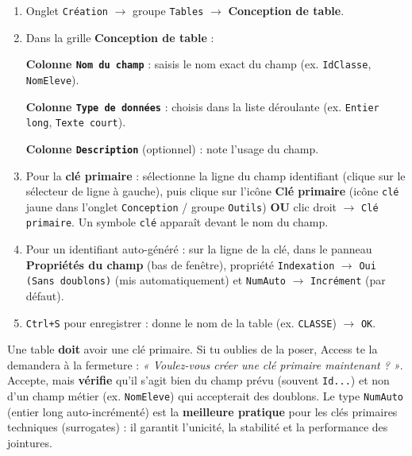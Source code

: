 \documentclass[11pt]{article}
\begin{document}
\begin{methode}
\begin{enumerate}
    \item Onglet \texttt{Création} $\to$ groupe \texttt{Tables} $\to$ \textbf{Conception de table}.
    \item Dans la grille \textbf{Conception de table} :\par
    \textbf{Colonne \texttt{Nom du champ}} : saisis le nom exact du champ (ex. \texttt{IdClasse}, \texttt{NomEleve}).\par
    \textbf{Colonne \texttt{Type de données}} : choisis dans la liste déroulante (ex. \texttt{Entier long}, \texttt{Texte court}).\par
    \textbf{Colonne \texttt{Description}} (optionnel) : note l'usage du champ.
    \item Pour la \textbf{clé primaire} : sélectionne la ligne du champ identifiant (clique sur le sélecteur de ligne à gauche), puis clique sur l'icône \textbf{Clé primaire} (icône \texttt{clé} jaune dans l'onglet \texttt{Conception} / groupe \texttt{Outils}) \textbf{OU} clic droit $\to$ \texttt{Clé primaire}. Un symbole \texttt{clé} apparaît devant le nom du champ.
    \item Pour un identifiant auto-généré : sur la ligne de la clé, dans le panneau \textbf{Propriétés du champ} (bas de fenêtre), propriété \texttt{Indexation} $\to$ \texttt{Oui (Sans doublons)} (mis automatiquement) et \texttt{NumAuto} $\to$ \texttt{Incrément} (par défaut).
    \item \texttt{Ctrl+S} pour enregistrer : donne le nom de la table (ex. \texttt{CLASSE}) $\to$ \texttt{OK}.
\end{enumerate}
\end{methode}

\begin{attention}
Une table \textbf{doit} avoir une clé primaire. Si tu oublies de la poser, Access te la demandera à la fermeture : \emph{« Voulez-vous créer une clé primaire maintenant ? »}. Accepte, mais \textbf{vérifie} qu'il s'agit bien du champ prévu (souvent \texttt{Id...}) et non d'un champ métier (ex. \texttt{NomEleve}) qui accepterait des doublons. Le type \texttt{NumAuto} (entier long auto-incrémenté) est la \textbf{meilleure pratique} pour les clés primaires techniques (surrogates) : il garantit l'unicité, la stabilité et la performance des jointures.
\end{attention}
\end{document}
